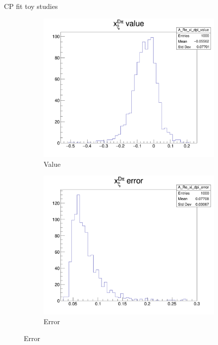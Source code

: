 \documentclass{beamer}
\begin{document}
\begin{frame}{CP fit toy studies}
  \begin{figure}
    \centering
    \begin{subfigure}{0.25\textwidth}
      \includegraphics[width = 1.0\textwidth]{Plots/A_Re_xi_dpi_value.png}
      \caption{Value}
    \end{subfigure}%
    \begin{subfigure}{0.25\textwidth}
      \includegraphics[width = 1.0\textwidth]{Plots/A_Re_xi_dpi_error.png}
      \caption{Error}
    \end{subfigure}%

\end{figure}
\end{frame}
\end{document}
